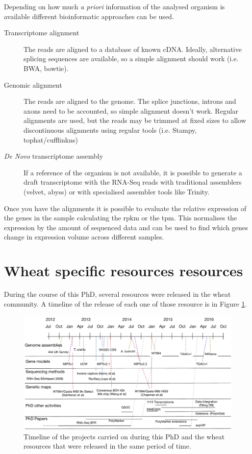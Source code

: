 Depending on how much \textit{a priori} information of the analysed organism is available different bioinformatic approaches can be used.
\begin{description}
\item[Transcriptome alignment] The reads are aligned to a database of known cDNA. Ideally, alternative splicing sequences are available, so a simple alignment should work (i.e. BWA, bowtie). 
\item[Genomic alignment] The reads are aligned to the genome. The splice junctions, introns and axons need to be accounted, so simple alignment doesn't work. Regular alignments are used, but the reads may be trimmed at fixed sizes to allow discontinuous alignments using regular tools (i.e. Stampy, tophat/cufflinkns)
\item[\textit{De Novo} transcriptome assembly] If a reference of the organism is not available, it is possible to generate a draft transcriptome with the RNA-Seq reads with traditional assemblers (velvet, abyss) or with specialised assembler tools like Trinity. 
\end{description}

Once you have the alignments it is possible to evaluate the relative expression of the genes in the sample calculating the \gls{rpkm} or the \gls{tpm}. This normalises the expression by the amount of sequenced data and can be used to find which genes change in expression volume across different samples.   


\section{Wheat specific resources resources}
\label{lit:wheatResourcers}

During the course of this PhD, several resources were released in the wheat community. A timeline of the release of each one of those resource is in Figure \ref{fig:intro:timeline}. 

 \begin{figure}
  \centering
  \includegraphics[width=1\textheight]{Introduction/RicardoPhdTimelineV1.pdf}
  \caption[PhD timeline.]{Timeline of the projects carried on during this PhD and the wheat resources that were released in the same period of time. }
  \label{fig:intro:timeline}
 \end{figure}
